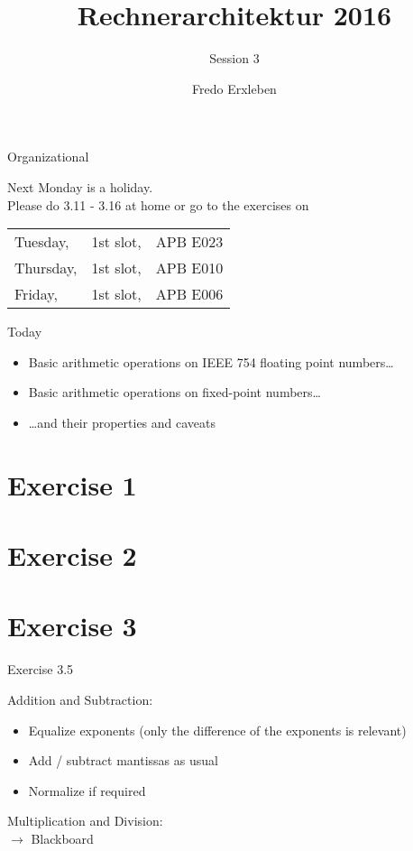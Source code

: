 \documentclass[11pt]{tudbeamer}
\title{Rechnerarchitektur 2016}
\subtitle{Session 3}
\author{Fredo Erxleben}
\begin{document}
  \maketitle

\begin{frame}{Organizational}

	Next Monday is a holiday.\\
	Please do 3.11 - 3.16 at home or go to the exercises on

	\begin{tabular}{lcc}
		Tuesday, 	&1st slot, &APB E023\\
		Thursday, 	&1st slot, &APB E010\\
		Friday, 		&1st slot, &APB E006\\
	\end{tabular}

\end{frame}

\begin{frame}{Today}

	\begin{itemize}
		\item Basic arithmetic operations on IEEE 754 floating point numbers\dots
		\item Basic arithmetic operations on fixed-point numbers\dots
		\item \dots and their properties and caveats
	\end{itemize} 

\end{frame}

\section{Exercise 1}
\section{Exercise 2}
\section{Exercise 3}

\begin{frame}[allowframebreaks]{Exercise 3.5}

	Addition and Subtraction:\\

	\begin{itemize}
		\item Equalize exponents (only the difference of the exponents is relevant)
		\item Add / subtract mantissas as usual
		\item Normalize if required
	\end{itemize}

\framebreak

	Multiplication and Division: \\
	$\rightarrow$ Blackboard
\end{frame}
\end{document}
